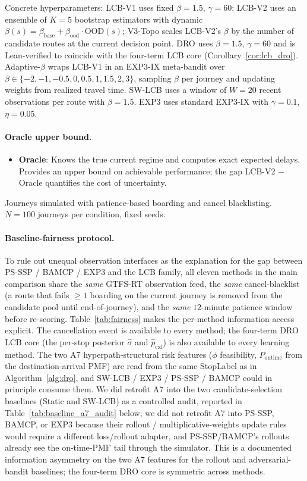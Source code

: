 \documentclass[11pt]{article}
\theoremstyle{definition}
\theoremstyle{remark}
\begin{document}
Concrete hyperparameters: LCB-V1 uses fixed $\beta{=}1.5$,
$\gamma{=}60$; LCB-V2 uses an ensemble of $K{=}5$ bootstrap
estimators with dynamic $\beta(s) = \beta_{\mathrm{base}} +
\beta_{\mathrm{ood}}\!\cdot\!\mathrm{OOD}(s)$; V3-Topo scales
LCB-V2's $\beta$ by the number of candidate routes at the
current decision point. DRO uses $\beta{=}1.5$, $\gamma{=}60$ and
is Lean-verified to coincide with the four-term LCB core
(Corollary~\ref{cor:lcb_dro}). Adaptive-$\beta$ wraps LCB-V1 in an
EXP3-IX meta-bandit over $\beta \in
\{-2,-1,-0.5,0,0.5,1,1.5,2,3\}$, sampling $\beta$ per journey and
updating weights from realized travel time. SW-LCB uses a window
of $W{=}20$ recent observations per route with $\beta{=}1.5$.
EXP3 uses standard EXP3-IX with $\gamma{=}0.1$, $\eta{=}0.05$.

\paragraph{Oracle upper bound.}
\begin{itemize}
    \item \textbf{Oracle}: Knows the true current regime and computes exact expected delays. Provides an upper bound on achievable performance; the gap LCB-V2 $-$ Oracle quantifies the cost of uncertainty.
\end{itemize}

Journeys simulated with patience-based boarding and cancel blacklisting. $N{=}100$ journeys per condition, fixed seeds.

\paragraph{Baseline-fairness protocol.} To rule out unequal
observation interfaces as the explanation for the gap between
PS-SSP / BAMCP / EXP3 and the LCB family, all eleven methods in the main comparison share the
\emph{same} GTFS-RT observation feed, the \emph{same} cancel-blacklist
(a route that fails $\geq 1$ boarding on the current journey is
removed from the candidate pool until end-of-journey), and the
\emph{same} $12$-minute patience window before re-scoring.
Table~\ref{tab:fairness} makes the per-method information access
explicit. The cancellation event is available to every method;
the four-term DRO LCB core (the per-stop posterior $\hat\sigma$
and $\hat p_{\mathrm{cxl}}$) is also available to every learning
method. The two A7 hyperpath-structural risk features
($\phi$ feasibility, $P_{\mathrm{ontime}}$ from the destination-arrival
PMF) are read from the same StopLabel as in
Algorithm~\ref{alg:dro}, and SW-LCB / EXP3 / PS-SSP / BAMCP could
in principle consume them. We did retrofit A7 into the two
candidate-selection baselines (Static and SW-LCB) as a controlled
audit, reported in Table~\ref{tab:baseline_a7_audit} below; we
did not retrofit A7 into PS-SSP, BAMCP, or EXP3 because their
rollout / multiplicative-weights update rules would require a
different loss/rollout adapter, and PS-SSP/BAMCP's rollouts
already see the on-time-PMF tail through the simulator. This is
a documented information asymmetry on the two A7 features for
the rollout and adversarial-bandit baselines; the four-term DRO
core is symmetric across methods.
\end{document}
